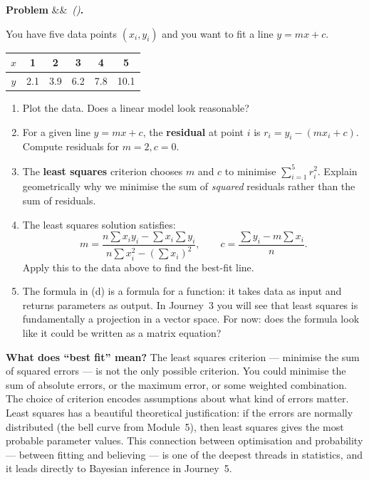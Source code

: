 \documentclass[12pt, a4paper]{article}
\newcounter{problem}
\newenvironment{problem}[1][]{%
  \refstepcounter{problem}%
  \par\vspace{6pt}%
  \noindent\textbf{\color{MidBlue}Problem \theproblem}%
  \ifx&#1&\else\ \textit{(#1)}\fi\textbf{.}\enskip
}{\par\vspace{4pt}}
\begin{document}
\begin{problem}
\label{prob:least_squares}
You have five data points $(x_i, y_i)$ and you want to fit a line $y = mx + c$.

\begin{center}
\begin{tabular}{cccccc}
\toprule
$x$ & 1 & 2 & 3 & 4 & 5 \\
\midrule
$y$ & 2.1 & 3.9 & 6.2 & 7.8 & 10.1 \\
\bottomrule
\end{tabular}
\end{center}

\begin{enumerate}[label=(\alph*), topsep=2pt]
  \item Plot the data. Does a linear model look reasonable?
  \item For a given line $y = mx + c$, the \textbf{residual} at point $i$ is $r_i = y_i - (mx_i + c)$. Compute residuals for $m = 2, c = 0$.
  \item The \textbf{least squares} criterion chooses $m$ and $c$ to minimise $\sum_{i=1}^5 r_i^2$. Explain geometrically why we minimise the sum of \emph{squared} residuals rather than the sum of residuals.
  \item The least squares solution satisfies:
  \[
    m = \frac{n\sum x_i y_i - \sum x_i \sum y_i}{n\sum x_i^2 - \left(\sum x_i\right)^2}, \qquad
    c = \frac{\sum y_i - m\sum x_i}{n}.
  \]
  Apply this to the data above to find the best-fit line.
  \item The formula in (d) is a formula for a function: it takes data as input and returns parameters as output. In Journey~3 you will see that least squares is fundamentally a projection in a vector space. For now: does the formula look like it could be written as a matrix equation?
\end{enumerate}
\end{problem}

\begin{thought}
\textbf{What does ``best fit'' mean?}
The least squares criterion --- minimise the sum of squared errors --- is not the only possible criterion. You could minimise the sum of absolute errors, or the maximum error, or some weighted combination. The choice of criterion encodes assumptions about what kind of errors matter. Least squares has a beautiful theoretical justification: if the errors are normally distributed (the bell curve from Module~5), then least squares gives the most probable parameter values. This connection between optimisation and probability --- between fitting and believing --- is one of the deepest threads in statistics, and it leads directly to Bayesian inference in Journey~5.
\end{thought}
\end{document}
